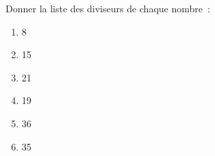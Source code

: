 \documentclass[exercice]{thedocument}%
\begin{document}
%
Donner la liste des diviseurs de chaque nombre~:
\begin{enumerate}
    \item 8
    \item 15
    \item 21
    \item 19
    \item 36
    \item 35
\end{enumerate}
\end{document}
